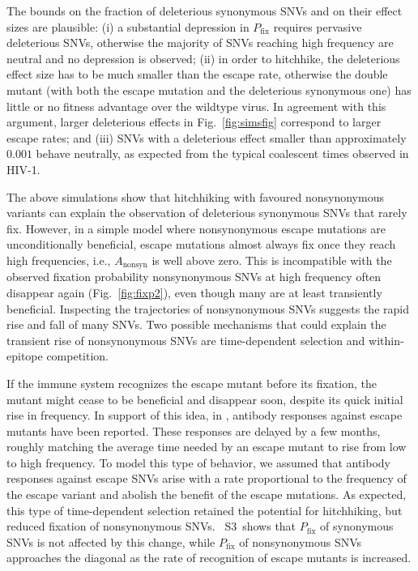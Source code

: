\documentclass[11pt]{article}
\newcommand{\pfix}{P_{\mathrm{fix}}}
\newcommand{\FIG}[1]{Fig.~\ref{fig:#1}}
\newcommand{\timedependence}{3}
\begin{document}
The bounds on the fraction of deleterious synonymous SNVs and
on their effect sizes are plausible:
(i) a substantial depression in $\pfix$ requires pervasive deleterious SNVs, otherwise
the majority of SNVs reaching high frequency are neutral and no depression is
observed; (ii) in order to hitchhike, the deleterious effect size has to be much
smaller than the escape rate, otherwise the double mutant (with both the escape
mutation and the deleterious synonymous one) has little or no fitness advantage
over the wildtype virus. In agreement with this argument, larger deleterious
effects in \FIG{simsfig} correspond to larger escape rates; and (iii) SNVs
with a deleterious effect smaller than approximately $0.001$ behave neutrally,
as expected from the typical coalescent times observed in HIV-1.

The above simulations show that hitchhiking with favoured nonsynonymous
variants can explain the observation of
deleterious synonymous SNVs that rarely fix. However, in a simple model where
nonsynonymous escape mutations are unconditionally beneficial, escape mutations almost
always fix once they reach high frequencies, i.e., $A_{\mathrm{nonsyn}}$ is well
above zero. This is incompatible with the observed fixation probability
nonsynonymous SNVs at high frequency often disappear again (\FIG{fixp2}), even
though many are at least transiently beneficial. Inspecting the trajectories of
nonsynonymous SNVs suggests the rapid rise and fall of many SNVs. Two
possible mechanisms that could explain the transient rise of
nonsynonymous SNVs are time-dependent selection and within-epitope competition.

If the immune system
recognizes the escape mutant before its fixation, the mutant might cease to be
beneficial and disappear soon, despite its quick initial rise in frequency. In
support of this idea, in \citet{richman_rapid_2003, bunnik_autologous_2008},
antibody responses against escape mutants have been reported. These responses are
delayed by a few months, roughly matching the average time needed by an escape
mutant to rise from low to high frequency. To model this type of behavior, we
assumed that antibody responses against escape SNVs arise with a rate
proportional to the frequency of the escape variant and abolish the benefit of the
escape mutations. As expected, this type of time-dependent selection retained the
potential for hitchhiking, but reduced fixation of nonsynonymous SNVs.
\figurename~S\timedependence~shows that $\pfix$ of synonymous SNVs is not
affected by this change, while $\pfix$ of nonsynonymous SNVs approaches the
diagonal as the rate of recognition of escape mutants is increased. 
\end{document}
